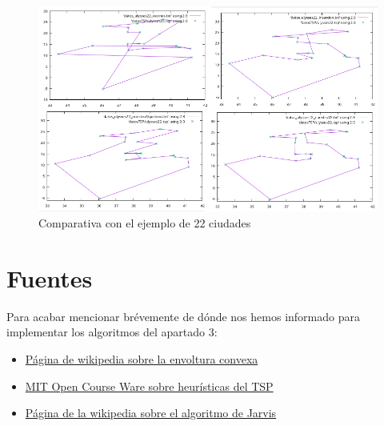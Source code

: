 \documentclass{article}
\begin{document}
\begin{figure}[H]
	\centering
	\includegraphics[totalheight=8cm]{img/comparativa3}
	\caption{Comparativa con el ejemplo de 22 ciudades}
	\label{fig:comparativa3}
\end{figure}



\section{Fuentes}
Para acabar mencionar brévemente de dónde nos hemos informado para implementar los algoritmos del apartado 3:
\begin{itemize}
 \item \href{https://en.wikipedia.org/wiki/Convex_hull}{Página de wikipedia sobre la envoltura convexa}
 \item \href{https://ocw.mit.edu/courses/civil-and-environmental-engineering/1-203j-logistical-and-transportation-planning-methods-fall-2006/lecture-notes/lec16.pdf}{MIT Open Course Ware sobre heurísticas del TSP}
 \item \href{https://en.wikipedia.org/wiki/Gift_wrapping_algorithm}{Página de la wikipedia sobre el algoritmo de Jarvis}
\end{itemize}
\end{document}
